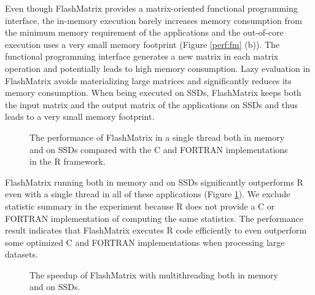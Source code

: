 Even though FlashMatrix provides a matrix-oriented functional programming
interface, the in-memory execution barely increases memory consumption from
the minimum memory requirement of the applications and the out-of-core
execution uses a very small memory footprint (Figure \ref{perf:fm} (b)).
The functional programming interface generates a new matrix in each matrix
operation and potentially leads to high memory consumption. Lazy evaluation
in FlashMatrix avoids materializing large matrices and significantly
reduces its memory consumption.
When being executed on SSDs, FlashMatrix keeps both the input matrix and
the output matrix of the applications on SSDs and thus leads to a very small
memory footprint.

\begin{figure}
	\begin{center}
		\footnotesize
		\vspace{-15pt}
		
		\vspace{-10pt}
		\caption{The performance of FlashMatrix in a single thread both in
			memory and on SSDs compared with the C and FORTRAN implementations
		in the R framework.}
		\label{fig:fmR}
	\end{center}
\end{figure}

FlashMatrix running both in memory and on SSDs significantly outperforms R
even with a single thread in all of these applications (Figure \ref{fig:fmR}).
We exclude statistic summary in the experiment because R does not provide
a C or FORTRAN implementation of computing the same statistics. The performance
result indicates that FlashMatrix executes R code efficiently to even outperform
some optimized C and FORTRAN implementations when processing large datasets.

\begin{figure}
	\begin{center}
		\footnotesize
		\vspace{-15pt}
		
		\vspace{-10pt}
		\caption{The speedup of FlashMatrix with multithreading both in memory
		and on SSDs.}
		\label{fig:speedup}
	\end{center}
\end{figure}

